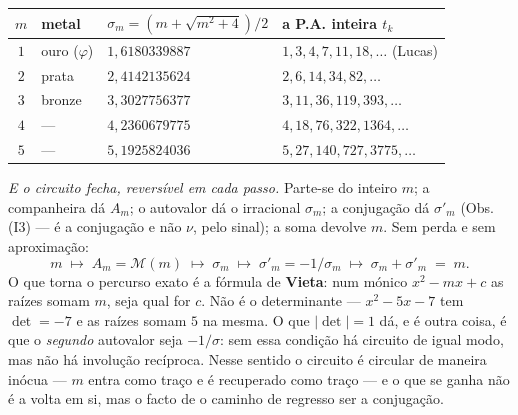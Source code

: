 \documentclass[11pt,a4paper]{article}
\theoremstyle{plain}
\theoremstyle{definition}
\theoremstyle{remark}
\newcommand{\Mat}[1]{\mathcal{M}(#1)}
\begin{document}
\begin{center}\small
\begin{tabular}{clll}
\hline
$m$ & metal & $\sigma_m = (m+\sqrt{m^2+4})/2$ & a P.A. inteira $t_k$ \\ \hline
$1$ & ouro ($\varphi$) & $1{,}6180339887$ & $1,3,4,7,11,18,\dots$ (Lucas) \\
$2$ & prata & $2{,}4142135624$ & $2,6,14,34,82,\dots$ \\
$3$ & bronze & $3{,}3027756377$ & $3,11,36,119,393,\dots$ \\
$4$ & --- & $4{,}2360679775$ & $4,18,76,322,1364,\dots$ \\
$5$ & --- & $5{,}1925824036$ & $5,27,140,727,3775,\dots$ \\
\hline
\end{tabular}
\end{center}

\noindent \emph{E o circuito fecha, reversível em cada passo.} Parte-se do inteiro $m$; a
companheira dá $A_m$; o autovalor dá o irracional $\sigma_m$; a conjugação dá $\sigma'_m$
(Obs. (I3) --- é a conjugação e não $\nu$, pelo sinal); a soma devolve $m$. Sem perda
e sem aproximação:
\[
  m \;\longmapsto\; A_m=\Mat{m} \;\longmapsto\; \sigma_m \;\longmapsto\;
  \sigma'_m = -1/\sigma_m \;\longmapsto\; \sigma_m + \sigma'_m \;=\; m .
\]
O que torna o percurso exato é a fórmula de \textbf{Vieta}: num mónico $x^2-mx+c$ as raízes somam
$m$, seja qual for $c$. Não é o determinante --- $x^2-5x-7$ tem $\det = -7$ e as raízes somam $5$
na mesma. O que $|\det|=1$ dá, e é outra coisa, é que o \emph{segundo} autovalor seja $-1/\sigma$:
sem essa condição há circuito de igual modo, mas não há involução recíproca. Nesse sentido o
circuito é circular de maneira inócua --- $m$ entra como traço e é recuperado como traço --- e o
que se ganha não é a volta em si, mas o facto de o caminho de regresso ser a conjugação.
\end{document}
